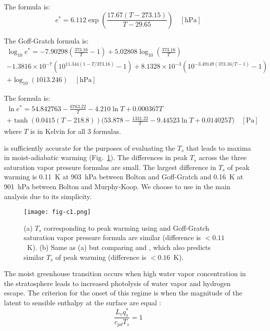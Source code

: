 \documentclass[draft]{ametsocV6.1}
\begin{document}
The \cite{bolton1980} formula is:
\begin{equation}
e^* = 6.112 \exp\left(\frac{17.67 (T - 273.15)}{T - 29.65}\right) \quad [\text{hPa}]
\label{eq:bolton}
\end{equation}

The Goff-Gratch formula is:
\begin{multline}
\log_{10} e^* = -7.90298 \left(\frac{373.16}{T} - 1\right) + 5.02808 \log_{10}\left(\frac{373.16}{T}\right)\\ - 1.3816 \times 10^{-7} \left(10^{11.344 (1 - T/373.16)} - 1\right) + 8.1328 \times 10^{-3} \left(10^{-3.49149 (373.16/T - 1)} - 1\right)\\ + \log_{10}(1013.246) \quad [\text{hPa}]
\end{multline}

The \cite{murphy2005} formula is:
\begin{multline}
\ln e^* = 54.842763 - \frac{6763.22}{T} - 4.210 \ln T + 0.000367 T\\ + \tanh\left(0.0415 (T - 218.8)\right) \biggl(53.878 - \frac{1331.22}{T} - 9.44523 \ln T + 0.014025 T\biggl) \quad [\text{Pa}]
\end{multline}
where $T$ is in Kelvin for all 3 formulas.

\cite{bolton1980} is sufficiently accurate for the purposes of evaluating the $T_s$ that leads to maxima in moist-adiabatic warming (Fig.~\ref{fig:fig-c1}). The differences in peak $T_s$ across the three saturation vapor pressure formulas are small. The largest difference in $T_s$ of peak warming is 0.11~K at 903~hPa between Bolton and Goff-Gratch and 0.16~K at 901~hPa between Bolton and Murphy-Koop. We choose to use \cite{bolton1980} in the main analysis due to its simplicity.

\begin{figure}[htbp]
 \centering
 \texttt{[image: fig-c1.png]}
 \caption{(a) $T_s$ corresponding to peak warming using \cite{bolton1980} and Goff-Gratch saturation vapor pressure formula are similar (difference is $<0.11$~K). (b) Same as (a) but comparing \cite{bolton1980} and \cite{murphy2005}, which also predicts similar $T_s$ of peak warming (difference is $<0.16$~K).}\label{fig:fig-c1}
\end{figure}

\appendix[D] 
\label{app:sens-vs-mag}
The moist greenhouse transition occurs when high water vapor concentration in the stratosphere leads to increased photolysis of water vapor and hydrogen escape. The criterion for the onset of this regime is when the magnitude of the latent to sensible enthalpy at the surface are equal \citep{wordsworth2013}:
\begin{equation}
\frac{L_v q_s^*}{c_{pd} T_s} = 1
\label{eq:mag-equal}
\end{equation}
\end{document}
